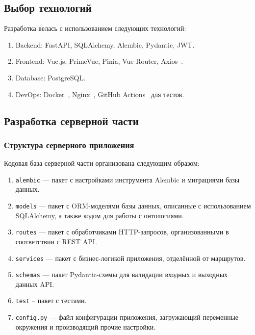 \subsection{Выбор технологий}

Разработка велась с использованием следующих технологий:
\begin{enumerate}
    \item Backend: FastAPI, SQLAlchemy, Alembic, Pydantic, JWT.
    \item Frontend: Vue.js, PrimeVue, Pinia, Vue Router, Axios~\cite{Library:Axios}.
    \item Database: PostgreSQL.
    \item DevOps: Docker~\cite{Tool:Docker}, Nginx~\cite{Tool:Nginx}, GitHub Actions~\cite{Tool:GitHubActions} для тестов.
\end{enumerate}

\subsection{Разработка серверной части}

\subsubsection{Структура серверного приложения}

Кодовая база серверной части организована следующим образом:

\begin{enumerate}
    \item \texttt{alembic} — пакет с настройками инструмента Alembic и миграциями базы данных.
    \item \texttt{models} — пакет с ORM-моделями базы данных, описанные с использованием SQLAlchemy, а также кодом для работы с онтологиями.
    \item \texttt{routes} — пакет с обработчиками HTTP-запросов, организованными в соответствии с REST API.
    \item \texttt{services} — пакет с бизнес-логикой приложения, отделённой от маршрутов.
    \item \texttt{schemas} — пакет Pydantic-схемы для валидации входных и выходных данных API.
    \item \texttt{test} – пакет с тестами.
    \item \texttt{config.py} — файл конфигурации приложения, загружающий переменные окружения и производящий прочие настройки.
\end{enumerate}

